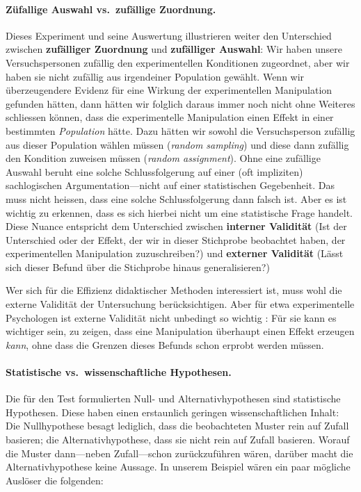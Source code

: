 \documentclass[oneside, 10pt]{book}\usepackage[]{graphicx}\usepackage[]{xcolor}
\begin{document}
\paragraph{Züfallige Auswahl vs.\ zufällige Zuordnung.}
Dieses Experiment und seine Auswertung illustrieren
weiter den Unterschied zwischen \textbf{zufälliger Zuordnung}
und \textbf{zufälliger Auswahl}: Wir haben unsere Versuchspersonen
zufällig den experimentellen Konditionen zugeordnet,
aber wir haben sie nicht zufällig aus irgendeiner Population gewählt.
Wenn wir überzeugendere Evidenz für eine Wirkung der experimentellen
Manipulation gefunden hätten,
dann hätten wir folglich daraus immer noch nicht ohne Weiteres
schliessen können, dass die experimentelle Manipulation einen Effekt in
einer bestimmten \emph{Population} hätte.
Dazu hätten wir sowohl die Versuchsperson zufällig aus dieser
Population wählen müssen (\textit{random sampling})
und diese dann zufällig den Kondition zuweisen müssen
(\textit{random assignment}). Ohne eine zufällige Auswahl beruht
eine solche Schlussfolgerung auf einer (oft impliziten) sachlogischen
Argumentation---nicht auf einer statistischen Gegebenheit. Das muss
nicht heissen, dass eine solche Schlussfolgerung dann falsch ist. Aber
es ist wichtig zu erkennen, dass es sich hierbei nicht um eine statistische Frage handelt.
Diese Nuance entspricht dem Unterschied zwischen
\textbf{interner Validität} (Ist der Unterschied oder der Effekt,
der wir in dieser Stichprobe beobachtet haben, der experimentellen
Manipulation zuzuschreiben?) und \textbf{externer Validität}
(Lässt sich dieser Befund über die Stichprobe hinaus generalisieren?)

Wer sich für
die Effizienz didaktischer Methoden interessiert ist, muss wohl die externe Validität der Untersuchung
berücksichtigen.
Aber für etwa experimentelle Psychologen ist externe Validität nicht
unbedingt so wichtig \citep{Mook1983}: Für sie kann es wichtiger sein, zu
zeigen, dass eine Manipulation überhaupt einen Effekt erzeugen \emph{kann},
ohne dass die Grenzen dieses Befunds schon erprobt werden müssen.

\paragraph{Statistische vs.\ wissenschaftliche Hypothesen.}
Die für den Test formulierten Null- und Alternativhypothesen
sind statistische Hypothesen. Diese haben einen erstaunlich
geringen wissenschaftlichen Inhalt: Die Nullhypothese besagt
lediglich, dass die beobachteten Muster rein auf Zufall
basieren; die Alternativhypothese, dass sie nicht rein auf
Zufall basieren. Worauf die Muster dann---neben Zufall---schon
zurückzuführen wären, darüber macht die Alternativhypothese
keine Aussage. In unserem Beispiel wären ein paar mögliche Auslöser
die folgenden:
\end{document}
